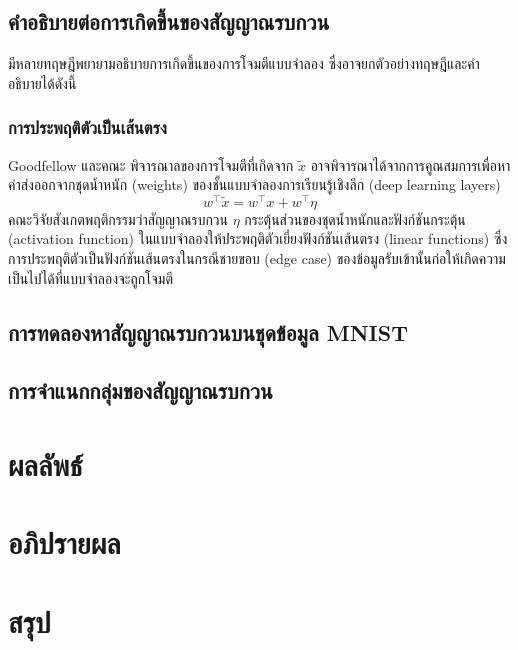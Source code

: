 \documentclass{cpepaper}
\begin{document}
\begin{multicols*}{2}
\subsection{คำอธิบายต่อการเกิดขึ้นของสัญญาณรบกวน}

มีหลายทฤษฎีพยายามอธิบายการเกิดขึ้นของการโจมตีแบบจำลอง ซึ่งอาจยกตัวอย่างทฤษฎีและคำอธิบายได้ดังนี้
\subsubsection{การประพฤติตัวเป็นเส้นตรง}
Goodfellow และคณะ พิจารณาลของการโจมตีที่เกิดจาก $\tilde{x}$ อาจพิจารณาได้จากการคูณสมการเพื่อหาค่าส่งออกจากชุดน้ำหนัก (weights) ของชั้นแบบจำลองการเรียนรู้เชิงลึก (deep learning layers) 
\begin{equation}
    w^\top\tilde{x} = w^\top x + w^\top \eta
\end{equation}
คณะวิจัยสังเกตพฤติกรรมว่าสัญญาณรบกวน $\eta$ กระตุ้นส่วนของชุดน้ำหนักและฟังก์ชันกระตุ้น (activation function) ในแบบจำลองให้ประพฤติตัวเยี่ยงฟังก์ชันเส้นตรง (linear functions) ซึ่งการประพฤติตัวเป็นฟังก์ชันเส้นตรงในกรณีชายขอบ (edge case) ของข้อมูลรับเข้านั้นก่อให้เกิดความเป็นไปได้ที่แบบจำลองจะถูกโจมตี

\subsection{การทดลองหาสัญญาณรบกวนบนชุดข้อมูล MNIST}

\subsection{การจำแนกกลุ่มของสัญญาณรบกวน}

\section{ผลลัพธ์}

\section{อภิปรายผล}

\section{สรุป}

\end{multicols*}
\end{document}
